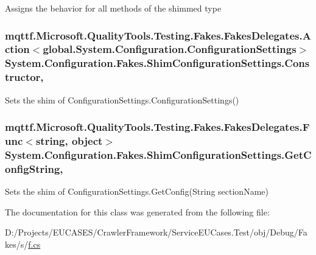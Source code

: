 Assigns the behavior for all methods of the shimmed type

\hypertarget{class_system_1_1_configuration_1_1_fakes_1_1_shim_configuration_settings_a7053f5d2afccf7ade0461b398cfc22e9}{
\subsubsection[{Constructor}]{\setlength{\rightskip}{0pt plus 5cm}mqttf.\-Microsoft.\-Quality\-Tools.\-Testing.\-Fakes.\-Fakes\-Delegates.\-Action$<$global.\-System.\-Configuration.\-Configuration\-Settings$>$ System.\-Configuration.\-Fakes.\-Shim\-Configuration\-Settings.\-Constructor\hspace{0.3cm}{\ttfamily [static]}, {\ttfamily [set]}}}\label{class_system_1_1_configuration_1_1_fakes_1_1_shim_configuration_settings_a7053f5d2afccf7ade0461b398cfc22e9}


Sets the shim of Configuration\-Settings.\-Configuration\-Settings()

\hypertarget{class_system_1_1_configuration_1_1_fakes_1_1_shim_configuration_settings_a9a037d2a857b4aac40852c2f6d7637e9}{
\subsubsection[{Get\-Config\-String}]{\setlength{\rightskip}{0pt plus 5cm}mqttf.\-Microsoft.\-Quality\-Tools.\-Testing.\-Fakes.\-Fakes\-Delegates.\-Func$<$string, object$>$ System.\-Configuration.\-Fakes.\-Shim\-Configuration\-Settings.\-Get\-Config\-String\hspace{0.3cm}{\ttfamily [static]}, {\ttfamily [set]}}}\label{class_system_1_1_configuration_1_1_fakes_1_1_shim_configuration_settings_a9a037d2a857b4aac40852c2f6d7637e9}


Sets the shim of Configuration\-Settings.\-Get\-Config(\-String section\-Name)



The documentation for this class was generated from the following file\-:\begin{DoxyCompactItemize}
\item 
D\-:/\-Projects/\-E\-U\-C\-A\-S\-E\-S/\-Crawler\-Framework/\-Service\-E\-U\-Cases.\-Test/obj/\-Debug/\-Fakes/s/\hyperlink{s_2f_8cs}{f.\-cs}\end{DoxyCompactItemize}
